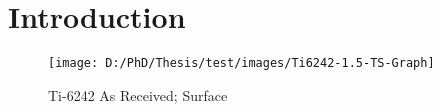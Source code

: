 \chapter{Introduction}

\begin{figure}[H]
    \centering
        \texttt{[image: D:/PhD/Thesis/test/images/Ti6242-1.5-TS-Graph]}
        \caption{Ti-6242 As Received; Surface}
    \label{fig:EDM-Cut}
\end{figure}